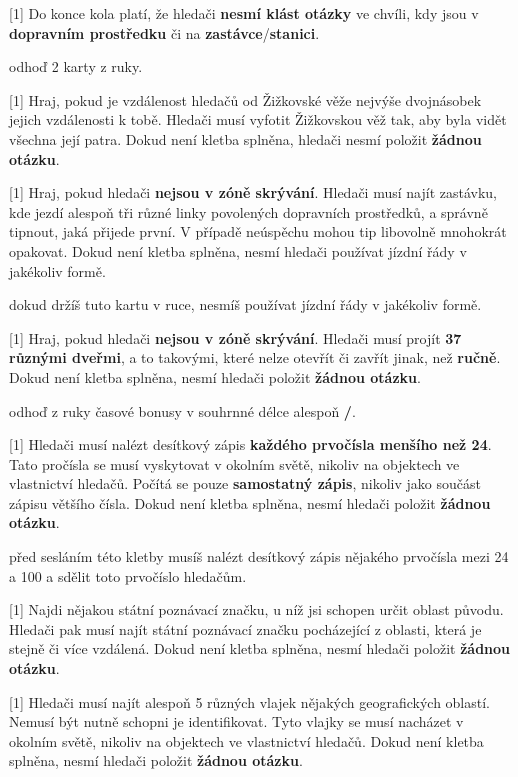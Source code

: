 \begin{cards}
	 Do konce kola platí, že hledači \textbf{nesmí klást otázky} ve chvíli, kdy jsou v \textbf{dopravním prostředku} či na \textbf{zastávce}/\textbf{stanici}.
	
	\cost odhoď 2 karty z ruky.
	
	 Hraj, pokud je vzdálenost hledačů od Žižkovské věže nejvýše dvojnásobek jejich vzdálenosti k tobě. Hledači musí vyfotit Žižkovskou věž tak, aby byla vidět všechna její patra. Dokud není kletba splněna, hledači nesmí položit \textbf{žádnou otázku}.
	
	 Hraj, pokud hledači \textbf{nejsou v zóně skrývání}. Hledači musí najít zastávku, kde jezdí alespoň tři různé linky povolených dopravních prostředků, a správně tipnout, jaká přijede první. V případě neúspěchu mohou tip libovolně mnohokrát opakovat. Dokud není kletba splněna, nesmí hledači používat jízdní řády v jakékoliv formě.
	
	\cost dokud držíš tuto kartu v ruce, nesmíš používat jízdní řády v jakékoliv formě.
	
	 Hraj, pokud hledači \textbf{nejsou v zóně skrývání}. Hledači musí projít \textbf{37 různými dveřmi}, a to takovými, které nelze otevřít či zavřít jinak, než \textbf{ručně}. Dokud není kletba splněna, nesmí hledači položit \textbf{žádnou otázku}.
	
	\cost odhoď z ruky časové bonusy v souhrnné délce alespoň \textbf{\timecursefellowshipcost/}.
	
	 Hledači musí nalézt desítkový zápis \textbf{každého prvočísla menšího než 24}. Tato pročísla se musí vyskytovat v okolním světě, nikoliv na objektech ve vlastnictví hledačů. Počítá se pouze \textbf{samostatný zápis}, nikoliv jako součást zápisu většího čísla. Dokud není kletba splněna, nesmí hledači položit \textbf{žádnou otázku}.
	
	\cost před sesláním této kletby musíš nalézt desítkový zápis nějakého prvočísla mezi 24 a 100 a sdělit toto prvočíslo hledačům.
	
	 Najdi nějakou státní poznávací značku, u níž jsi schopen určit oblast původu. Hledači pak musí najít státní poznávací značku pocházející z oblasti, která je stejně či více vzdálená. Dokud není kletba splněna, nesmí hledači položit \textbf{žádnou otázku}.
	
	 Hledači musí najít alespoň 5 různých vlajek nějakých geografických oblastí. Nemusí být nutně schopni je identifikovat. Tyto vlajky se musí nacházet v okolním světě, nikoliv na objektech ve vlastnictví hledačů. Dokud není kletba splněna, nesmí hledači položit \textbf{žádnou otázku}.
	

\end{cards}
